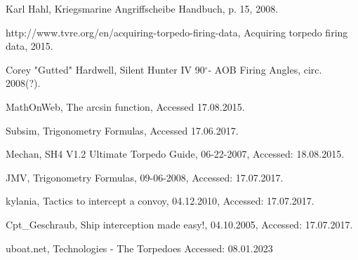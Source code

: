 \documentclass{article}
\newcommand{\degree}{$^{\circ}$}
\begin{document}
\pagebreak
\begin{thebibliography}{9}

  Karl Hahl,
  Kriegsmarine Angriffscheibe Handbuch,
  p. 15,
  2008.
  
http://www.tvre.org/en/acquiring-torpedo-firing-data,
Acquiring torpedo firing data,
2015.

Corey "Gutted" Hardwell,
Silent Hunter IV 90\degree - AOB Firing Angles,
circ. 2008(?).

MathOnWeb,
The arcsin function,
Accessed 17.08.2015.

Subsim,
Trigonometry Formulas,
Accessed 17.06.2017.

Mechan,
SH4 V1.2 Ultimate Torpedo Guide,
06-22-2007,
Accessed: 18.08.2015.

JMV,
Trigonometry Formulas,
09-06-2008,
Accessed: 17.07.2017.

kylania,
Tactics to intercept a convoy,
04.12.2010,
Accessed: 17.07.2017.

Cpt\_Geschraub,
Ship interception made easy!,
04.10.2005,
Accessed: 17.07.2017.

uboat.net,
Technologies - The Torpedoes
Accessed: 08.01.2023


\end{thebibliography}
\end{document}
